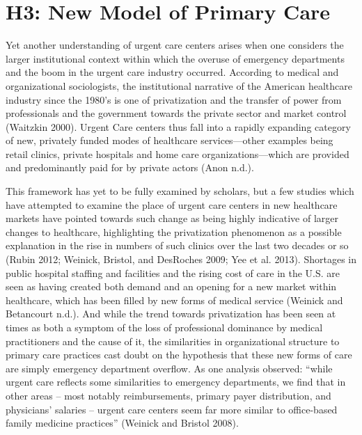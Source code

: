 \documentclass[12pt,twoside]{reedthesis}
\begin{document}
  \section*{H3: New Model of Primary
  Care}\label{h3-new-model-of-primary-care}
  
  Yet another understanding of urgent care centers arises when one
  considers the larger institutional context within which the overuse of
  emergency departments and the boom in the urgent care industry occurred.
  According to medical and organizational sociologists, the institutional
  narrative of the American healthcare industry since the 1980's is one of
  privatization and the transfer of power from professionals and the
  government towards the private sector and market control (Waitzkin
  2000). Urgent Care centers thus fall into a rapidly expanding category
  of new, privately funded modes of healthcare services---other examples
  being retail clinics, private hospitals and home care
  organizations---which are provided and predominantly paid for by private
  actors (Anon n.d.).
  
  This framework has yet to be fully examined by scholars, but a few
  studies which have attempted to examine the place of urgent care centers
  in new healthcare markets have pointed towards such change as being
  highly indicative of larger changes to healthcare, highlighting the
  privatization phenomenon as a possible explanation in the rise in
  numbers of such clinics over the last two decades or so (Rubin 2012;
  Weinick, Bristol, and DesRoches 2009; Yee et al. 2013). Shortages in
  public hospital staffing and facilities and the rising cost of care in
  the U.S. are seen as having created both demand and an opening for a new
  market within healthcare, which has been filled by new forms of medical
  service (Weinick and Betancourt n.d.). And while the trend towards
  privatization has been seen at times as both a symptom of the loss of
  professional dominance by medical practitioners and the cause of it, the
  similarities in organizational structure to primary care practices cast
  doubt on the hypothesis that these new forms of care are simply
  emergency department overflow. As one analysis observed: ``while urgent
  care reflects some similarities to emergency departments, we find that
  in other areas -- most notably reimbursements, primary payer
  distribution, and physicians' salaries -- urgent care centers seem far
  more similar to office-based family medicine practices'' (Weinick and
  Bristol 2008).
  
\end{document}
